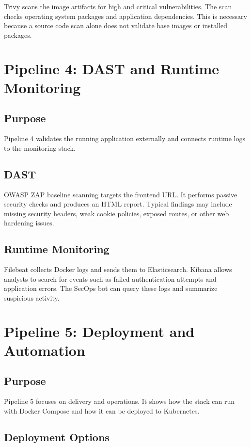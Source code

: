\documentclass[12pt,a4paper]{report}
\begin{document}
Trivy scans the image artifacts for high and critical vulnerabilities. The scan checks operating system packages and application dependencies. This is necessary because a source code scan alone does not validate base images or installed packages.

\section{Pipeline 4: DAST and Runtime Monitoring}

\subsection{Purpose}

Pipeline 4 validates the running application externally and connects runtime logs to the monitoring stack.

\subsection{DAST}

OWASP ZAP baseline scanning targets the frontend URL. It performs passive security checks and produces an HTML report. Typical findings may include missing security headers, weak cookie policies, exposed routes, or other web hardening issues.

\subsection{Runtime Monitoring}

Filebeat collects Docker logs and sends them to Elasticsearch. Kibana allows analysts to search for events such as failed authentication attempts and application errors. The SecOps bot can query these logs and summarize suspicious activity.

\section{Pipeline 5: Deployment and Automation}

\subsection{Purpose}

Pipeline 5 focuses on delivery and operations. It shows how the stack can run with Docker Compose and how it can be deployed to Kubernetes.

\subsection{Deployment Options}
\end{document}
